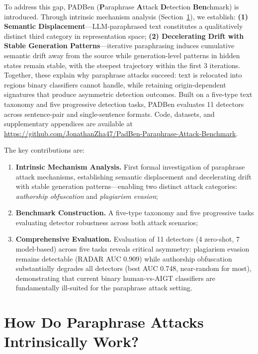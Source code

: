 \documentclass[runningheads]{llncs}
\newcommand{\repourl}{https://github.com/JonathanZha47/PadBen-Paraphrase-Attack-Benchmark}
\begin{document}
To address this gap, PADBen (\textbf{P}araphrase \textbf{A}ttack 
\textbf{D}etection \textbf{Ben}chmark) is introduced. Through intrinsic 
mechanism analysis (Section~\ref{sec:mechanism}), we establish: 
\textbf{(1) Semantic Displacement}---LLM-paraphrased text constitutes 
a qualitatively distinct third category in representation space; 
\textbf{(2) Decelerating Drift with Stable Generation Patterns}---iterative 
paraphrasing induces cumulative semantic drift away from the source 
while generation-level patterns in hidden states remain stable, with 
the steepest trajectory within the first 3 iterations. Together, these 
explain why paraphrase attacks succeed: text is relocated into regions 
binary classifiers cannot handle, while retaining origin-dependent 
signatures that produce asymmetric detection outcomes. Built on a 
five-type text taxonomy and five progressive detection tasks, PADBen 
evaluates 11 detectors across sentence-pair and single-sentence formats. Code, datasets, and supplementary appendices are available at \url{\repourl}.


\noindent The key contributions are:
\begin{enumerate}[nosep]
    \item \textbf{Intrinsic Mechanism Analysis.} First formal 
    investigation of paraphrase attack mechanisms, establishing semantic 
    displacement and decelerating drift with stable generation 
    patterns---enabling two distinct attack categories: 
    \textit{authorship obfuscation} and \textit{plagiarism evasion};
    \item \textbf{Benchmark Construction.} A five-type taxonomy and 
    five progressive tasks evaluating detector robustness across both 
    attack scenarios;
    \item \textbf{Comprehensive Evaluation.} Evaluation of 11 detectors 
(4 zero-shot, 7 model-based) across five tasks reveals critical 
asymmetry: plagiarism evasion remains detectable (RADAR AUC 0.909) 
while authorship obfuscation substantially degrades all detectors 
(best AUC 0.748, near-random for most), demonstrating that current 
binary human-vs-AIGT classifiers are fundamentally ill-suited for 
the paraphrase attack setting.
\end{enumerate}

\section{How Do Paraphrase Attacks Intrinsically Work?}
\label{sec:mechanism}
\end{document}
